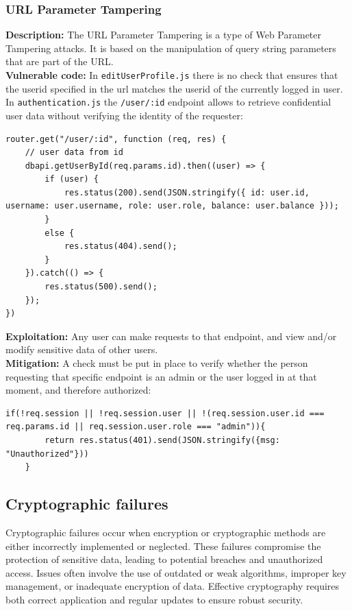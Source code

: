 \documentclass[]{article}
\begin{document}
\subsubsection{URL Parameter Tampering}
\textbf{Description:} The  URL Parameter Tampering is a type of Web Parameter Tampering attacks. It is based on the manipulation of query string parameters that are part of the URL.\\ 

\textbf{Vulnerable code:}
In \texttt{editUserProfile.js} there is no check that ensures that the userid specified in the url matches the userid of the currently logged in user.
In \texttt{authentication.js} the \texttt{/user/:id} endpoint allows to retrieve confidential user data without verifying the identity of the requester:
\begin{lstlisting}
router.get("/user/:id", function (req, res) {
    // user data from id
    dbapi.getUserById(req.params.id).then((user) => {
        if (user) {
            res.status(200).send(JSON.stringify({ id: user.id, username: user.username, role: user.role, balance: user.balance }));
        }
        else {
            res.status(404).send();
        }
    }).catch(() => {
        res.status(500).send();
    });
})
\end{lstlisting}
\textbf{Exploitation:} Any user can make requests to that endpoint, and view and/or modify sensitive data of other users.\\
\textbf{Mitigation:} A check must be put in place to verify whether the person requesting that specific endpoint is an admin or the user logged in at that moment, and therefore authorized:
\begin{lstlisting}
if(!req.session || !req.session.user || !(req.session.user.id === req.params.id || req.session.user.role === "admin")){
        return res.status(401).send(JSON.stringify({msg: "Unauthorized"}))
    }
\end{lstlisting}

\subsection{Cryptographic failures}
Cryptographic failures occur when encryption or cryptographic methods are either incorrectly implemented or neglected. These failures compromise the protection of sensitive data, leading to potential breaches and unauthorized access. Issues often involve the use of outdated or weak algorithms, improper key management, or inadequate encryption of data. Effective cryptography requires both correct application and regular updates to ensure robust security.
\end{document}
